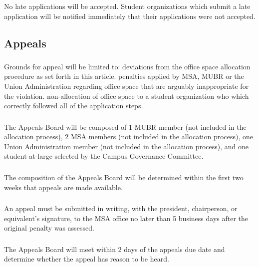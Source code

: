 \subsubsection{}
No late applications will be accepted.  Student organizations which submit a late application will be notified immediately that their applications were not accepted.


\subsection{Appeals}

\subsubsection{}
Grounds for appeal will be limited to:
\subsubsubsection{}
deviations from the office space allocation procedure as set forth in this article.  
\subsubsubsection{}
penalties applied by MSA, MUBR or the Union Administration regarding office space that are arguably inappropriate for the violation.
\subsubsubsection{}
non-allocation of office space to a student organization who which correctly followed all of the application steps.

\subsubsection{}
The Appeals Board will be composed of 1 MUBR member (not included in the allocation process), 2 MSA members (not included in the allocation process), one Union Administration member (not included in the allocation process), and one student-at-large selected by the Campus Governance Committee.

\subsubsection{}
The composition of the Appeals Board will be determined within the first two weeks that appeals are made available.

\subsubsection{}
An appeal must be submitted in writing, with the president, chairperson, or equivalent's signature, to the MSA office no later than 5 business days after the original penalty was assessed.

\subsubsection{}
The Appeals Board will meet within 2 days of the appeals due date and determine whether the appeal has reason to be heard.

